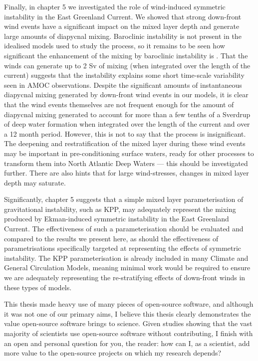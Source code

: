 Finally, in chapter 5 we investigated the role of wind-induced symmetric instability in the East Greenland Current. We showed that strong down-front wind events have a significant impact on the mixed layer depth and generate large amounts of diapycnal mixing. Baroclinic instability is not present in the idealised models used to study the process, so it remains to be seen how significant the enhancement of the mixing by baroclinic instability is \citep{Spall2016}. That the winds can generate up to 2 Sv of mixing (when integrated over the length of the current) suggests that the instability explains some short time-scale variability seen in AMOC observations. Despite the significant amounts of instantaneous diapycnal mixing generated by down-front wind events in our models, it is clear that the wind events themselves are not frequent enough for the amount of diapycnal mixing generated to account for more than a few tenths of a Sverdrup of deep water formation when integrated over the length of the current and over a 12 month period. However, this is not to say that the process is insignificant. The deepening and restratification of the mixed layer during these wind events may be important in pre-conditioning surface waters, ready for other processes to transform them into North Atlantic Deep Waters --- this should be investigated further. There are also hints that for large wind-stresses, changes in mixed layer depth may saturate.

Significantly, chapter 5 suggests that a simple mixed layer parameterisation of gravitational instability, such as KPP, may adequately represent the mixing produced by Ekman-induced symmetric instability in the East Greenland Current. The effectiveness of such a parameterisation should be evaluated and compared to the results we present here, as should the effectiveness of parametrisations specifically targeted at representing the effects of symmetric instability. The KPP parameterisation is already included in many Climate and General Circulation Models, meaning minimal work would be required to ensure we are adequately representing the re-stratifying effects of down-front winds in these types of models.

This thesis made heavy use of many pieces of open-source software, and although it was not one of our primary aims, I believe this thesis clearly demonstrates the value open-source software brings to science. Given studies showing that the vast majority of scientists use open-source software without contributing, I finish with an open and personal question for you, the reader: how can I, as a scientist, add more value to the open-source projects on which my research depends?




